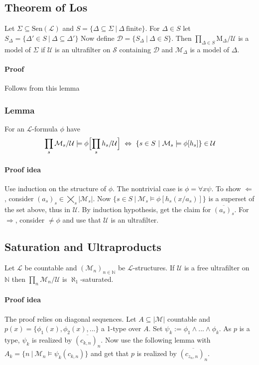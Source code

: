 \documentclass{scrartcl}
\newcommand{\N}{\mathbb{N}}
\begin{document}
\subsection{Theorem of Los}
Let $\Sigma \subseteq \mathrm{Sen}(\mathcal{L})$ and $S = \{ \Delta \subseteq \Sigma \ | \ \Delta \ \text{finite}\}$.
For $\Delta \in S$ let $S_\Delta = \{ \Delta' \in S \ | \ \Delta \subseteq \Delta' \}$
Now define $\mathcal{D} = \{ S_\Delta \ | \ \Delta \in S \}$.
Then $\prod_{\Delta \in S} \mathrm{M}_\Delta / \mathcal{U}$ is a model of $\Sigma$ if $\mathcal{U}$ is an ultrafilter on $\mathcal{S}$ containing $\mathcal{D}$ and $\mathcal{M}_\Delta$ is a model of $\Delta$.
\paragraph{Proof} Follows from this lemma

\subsubsection{Lemma}
For an $\mathcal{L}$-formula $\phi$ have
\begin{equation*}
    \prod_s \mathcal{M}_s / \mathcal{U} \models \phi \Bigl[ \prod_s h_s / \mathcal{U} \Bigr] \ \Leftrightarrow \ \{ s \in S \ | \ \mathcal{M}_s \models \phi[h_s] \} \in \mathcal{U}
\end{equation*}
\paragraph{Proof idea} Use induction on the structure of $\phi$. The nontrivial case is $\phi = \forall x \psi$.
To show $\Leftarrow$, consider $(a_s)_s \in \bigtimes_s |\mathcal{M}_s|$. 
Now $\{ s \in S \ | \ \mathcal{M}_s \models \phi[h_s(x / a_s)]\}$ is a superset of the set above, thus in $\mathcal{U}$.
By induction hypothesis, get the claim for $\overline{(a_s)_s}$.
For $\Rightarrow$, consider $\neq\phi$ and use that $\mathcal{U}$ is an ultrafilter.

\subsection{Saturation and Ultraproducts}
Let $\mathcal{L}$ be countable and $(\mathcal{M}_n)_{n \in \N}$ be $\mathcal{L}$-structures. If $\mathcal{U}$ is a free ultrafilter on $\N$ then $\prod_n \mathcal{M}_n/\mathcal{U}$ is $\aleph_1$-saturated.
\paragraph{Proof idea} The proof relies on diagonal sequences.
Let $A \subseteq |\mathcal{M}|$ countable and $p(x) = \{\phi_1(x), \phi_2(x), ...\}$ a 1-type over $A$. 
Set $\psi_k := \phi_1 \wedge ... \wedge \phi_k$.
As $p$ is a type, $\psi_k$ is realized by $\overline{(c_{k, n})_n}$. Now use the following lemma with $A_k = \{ n \ | \ \mathcal{M}_n \models \psi_k(c_{k, n}) \}$ and get that $p$ is realized by $\overline{(c_{z_n, n})_n}$.
\end{document}

